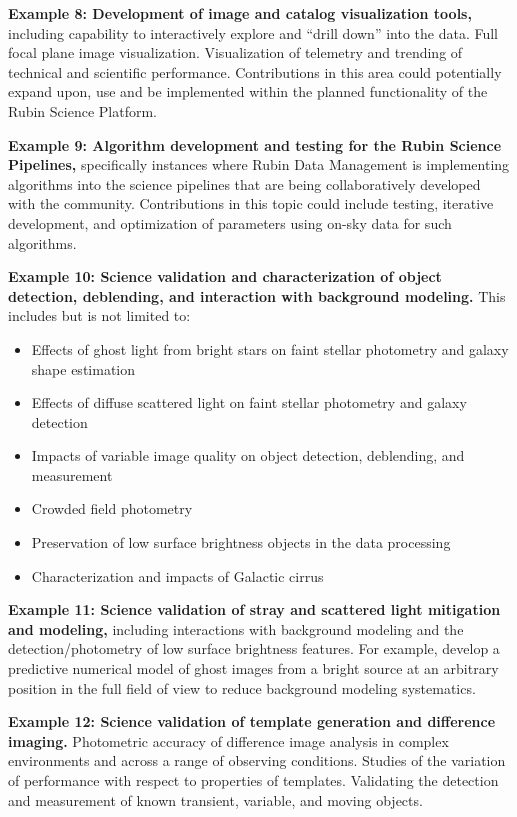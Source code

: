 \documentclass[SE,authoryear,toc]{lsstdoc}
\begin{document}
\textbf{Example 8: Development of image and catalog visualization tools,} including capability to interactively explore and ``drill down'' into the data. Full focal plane image visualization. Visualization of telemetry and trending of technical and scientific performance. Contributions in this area could potentially expand upon, use and be implemented within the planned functionality of the Rubin Science Platform.

\textbf{Example 9: Algorithm development and testing for the Rubin Science Pipelines,} specifically instances where Rubin Data Management is implementing algorithms into the science pipelines that are being collaboratively developed with the community. Contributions in this topic could include testing, iterative development, and optimization of parameters using on-sky data for such algorithms.

\textbf{Example 10: Science validation and characterization of object detection, deblending, and interaction with background modeling.} This includes but is not limited to:
\begin{itemize}
\item Effects of ghost light from bright stars on faint stellar photometry and galaxy shape estimation
\item Effects of diffuse scattered light on faint stellar photometry and galaxy detection
\item Impacts of variable image quality on object detection, deblending, and measurement
\item Crowded field photometry
\item Preservation of low surface brightness objects in the data processing
\item Characterization and impacts of Galactic cirrus
\end{itemize}

\textbf{Example 11: Science validation of stray and scattered light mitigation and modeling,} including interactions with background modeling and the detection/photometry of low surface brightness features. For example, develop a predictive numerical model of ghost images from a bright source at an arbitrary position in the full field of view to reduce background modeling systematics.

\textbf{Example 12: Science validation of template generation and difference imaging.} Photometric accuracy of difference image analysis in complex environments and across a range of observing conditions. Studies of the variation of performance with respect to properties of templates. Validating the detection and measurement of known transient, variable, and moving objects.
\end{document}

